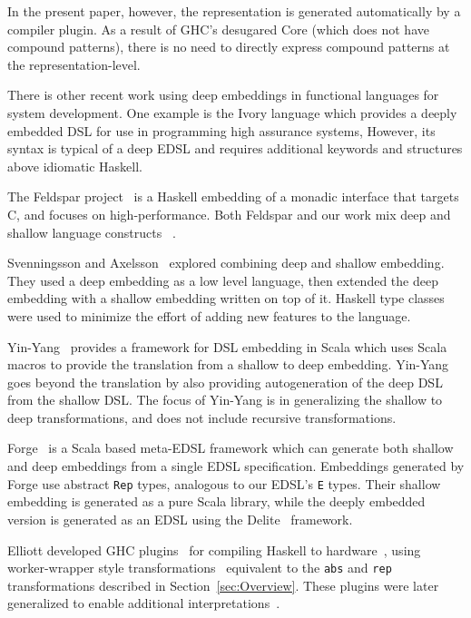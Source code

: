 \documentclass[runningheads, a4paper]{llncs}
\begin{document}
In the present paper, however, the representation is generated automatically by
a compiler plugin. As a result of GHC's desugared Core (which does not have
compound patterns), there is no need to directly express compound patterns at
the representation-level.

There is other recent work using deep embeddings in functional languages for 
system development.  One example is the Ivory language \cite{Elliott2015-Ivory} 
which provides a deeply embedded DSL for use in programming high assurance
systems,  However, its syntax is typical of a deep EDSL and requires additional
keywords and structures above idiomatic Haskell. 

The Feldspar project~\cite{Axelsson:10:Feldspar,Svenningsson:13:Combining}
is a Haskell embedding of a monadic interface
that targets C, and focuses on high-performance.  Both Feldspar and our work
mix deep and shallow language constructs ~\cite{Persson:11:MonadicDSL,Svenningsson:13:Compositional,Sculthorpe:13:ConstrainedMonad}.

Svenningsson and Axelsson~\cite{Svenningsson:13:Combining}
explored combining deep and shallow embedding.  They used
a deep embedding as a low level language, then extended
the deep embedding with a shallow embedding written on top
of it. Haskell type classes were used to minimize the effort of adding
new features to the language.

Yin-Yang~\cite{Jovanovic:2014} provides a framework for DSL
embedding in Scala which uses Scala macros to provide the 
translation from a shallow to deep embedding.  Yin-Yang
goes beyond the translation by also providing autogeneration
of the deep DSL from the shallow DSL.  The focus of
Yin-Yang is in generalizing the shallow to deep transformations,
and does not include recursive transformations.

Forge~\cite{Sujeeth:2013} is a Scala based meta-EDSL framework
which can generate both shallow and deep embeddings from
a single EDSL specification.  Embeddings generated by Forge
use abstract \verb|Rep| types, analogous to our EDSL's 
\verb|E| types.  Their shallow embedding is generated
as a pure Scala library, while the deeply embedded version
is generated as an EDSL using the Delite~\cite{Sujeeth:2014}
framework.

Elliott developed GHC plugins~\cite{github:lambda-ccc}\cite{github:reification-rules}
for compiling Haskell to hardware~\cite{github:Elliott:Talk:2015},
using worker-wrapper style transformations~\cite{Gill:09:WW}
equivalent to the \verb|abs| and
\verb|rep| transformations described in Section~\ref{sec:Overview}. These plugins were later generalized to enable additional interpretations~\cite{Elliott:2017}.
\end{document}
